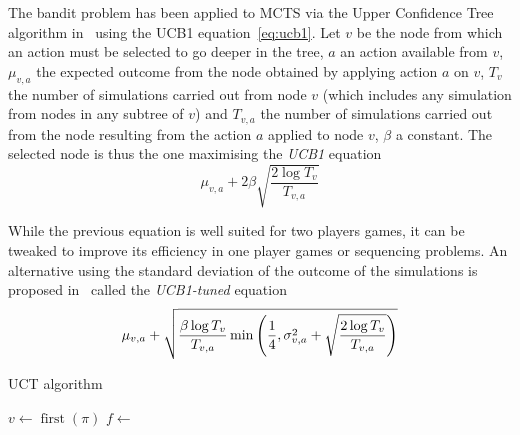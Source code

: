 \documentclass[oneside,twocolumn]{article}
\DeclareMathOperator{\argmax}{argmax}
\DeclareMathOperator{\first}{first}
\begin{document}
The bandit problem has been applied to MCTS via the Upper Confidence Tree
algorithm in~\cite{kocsis2006bandit} using the UCB1 equation~\ref{eq:ucb1}.
Let \(v\) be the node from which an action must be
selected to go deeper in the tree, \(a\) an action available from \(v\),
\(\mu_{v,a}\) the expected outcome from the node obtained by applying action
\(a\) on \(v\), \(T_v\) the number of simulations carried out from node \(v\)
(which includes any simulation from nodes in any subtree of \(v\)) and
\(T_{v,a}\) the number of simulations carried out from the node resulting from
the action \(a\) applied to node \(v\), \(\beta\) a constant. The selected node
is thus the one maximising the \emph{UCB1} equation
\begin{equation}
  \label{eq:ucb1}
  \mu_{v,a} + 2 \beta \sqrt{\frac{2 \log T_v}{T_{v,a}}}
\end{equation}

While the previous equation is well suited for two players games, it can be
tweaked to improve its efficiency in one player games or sequencing problems. An
alternative using the standard deviation of the outcome of the simulations is
proposed in~\cite{sebag2010fuse} called the \emph{UCB1-tuned} equation
\begin{equation}
  \mu_{v,a} +
  \sqrt{%
    \frac{\beta\log T_v}{T_{v,a}}
    \min\left( \frac{1}{4}, \sigma^2_{v,a} +
    \sqrt{%
      \frac{2 \log T_v}{T_{v,a}}
    }\right)
  }
\end{equation}
\begin{algorithm}
  \caption{UCT algorithm}\label{alg:tree_pol}
  \begin{algorithmic}
    \State{}\(v \gets \first(\pi)\)
    \State{}\Return{$\pi$}
    \Else{}
    \State{}
    \Else{}
    \State{}$f \gets$ 
    \State{}
    \EndIf{}
    \EndIf{}
    \EndFunction{}
  \end{algorithmic}
  \begin{algorithmic}
    \State{}\Return{$\argmax\{\Call{UCB}{v'} | v' \text{\,children of\,} v \}$}
    \EndFunction{}
  \end{algorithmic}
\end{algorithm}
\end{document}
